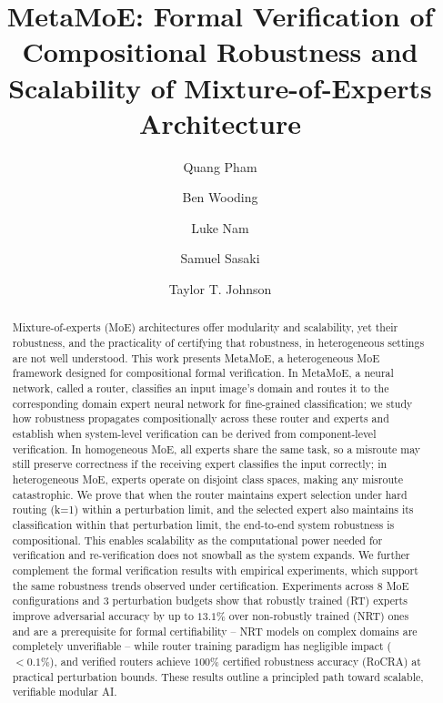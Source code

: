 \documentclass[runningheads]{llncs}
\begin{document}
\title{{\textsf{MetaMoE}:} Formal Verification of Compositional Robustness and Scalability of Mixture-of-Experts Architecture}

\author{Quang Pham \and Ben Wooding \and Luke Nam \and Samuel Sasaki \and Taylor T. Johnson}

\maketitle

\begin{abstract}
Mixture-of-experts (MoE) architectures offer modularity and scalability, yet their robustness, and the practicality of certifying that robustness, in heterogeneous settings are not well understood. This work presents \textsf{MetaMoE}, a heterogeneous MoE framework designed for compositional formal verification. In \textsf{MetaMoE}, a neural network, called a router, classifies an input image's domain and routes it to the corresponding domain expert neural network for fine-grained classification; we study how robustness propagates compositionally across these router and experts and establish when system-level verification can be derived from component-level verification. In homogeneous MoE, all experts share the same task, so a misroute may still preserve correctness if the receiving expert classifies the input correctly; in heterogeneous MoE, experts operate on disjoint class spaces, making any misroute catastrophic. We prove that when the router maintains expert selection under hard routing (k=1) within a perturbation limit, and the selected expert also maintains its classification within that perturbation limit, the end-to-end system robustness is compositional. This enables scalability as the computational power needed for verification and re-verification does not snowball as the system expands. We further complement the formal verification results with empirical experiments, which support the same robustness trends observed under certification. Experiments across 8 MoE configurations and 3 perturbation budgets show that robustly trained (RT) experts improve adversarial accuracy by up to $13.1\%$ over non-robustly trained (NRT) ones and are a prerequisite for formal certifiability -- NRT models on complex domains are completely unverifiable -- while router training paradigm has negligible impact ($<0.1\%$), and verified routers achieve $100\%$ certified robustness accuracy (RoCRA) at practical perturbation bounds. These results outline a principled path toward scalable, verifiable modular AI. 

\end{abstract}
\end{document}
